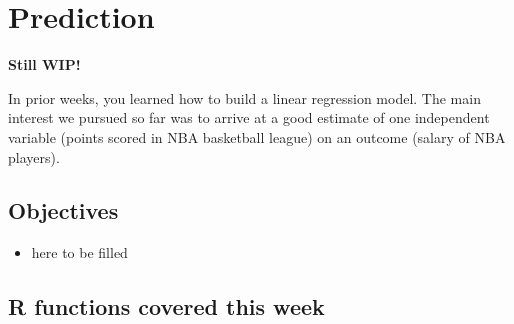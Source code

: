 \documentclass[
]{book}
\providecommand{\tightlist}{%
  \setlength{\itemsep}{0pt}\setlength{\parskip}{0pt}}
\begin{document}
\hypertarget{pm-t}{%
\chapter{Prediction}\label{pm-t}}

\textbf{Still WIP!}

In prior weeks, you learned how to build a linear regression model. The main interest
we pursued so far was to arrive at a good estimate of one independent variable (points scored in NBA basketball league) on an outcome (salary of NBA players).

\hypertarget{objectives-6}{%
\section{Objectives}\label{objectives-6}}

\begin{itemize}
\tightlist
\item
  here to be filled
\end{itemize}

\hypertarget{r-functions-covered-this-week-2}{%
\section{R functions covered this week}\label{r-functions-covered-this-week-2}}
\end{document}

